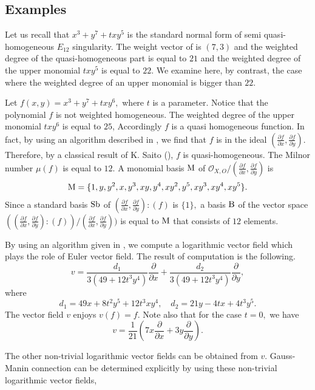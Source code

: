 \documentclass[pdftex]{arxsigma}
\begin{document}

\subsection{Examples}

Let us recall that $ x^3+y^7+txy^5 $ is the standard normal form of semi quasi-homogeneous  $E_{12}$ singularity. The weight vector of  is $(7,3)$ and the weighted degree of the quasi-homogeneous part is equal to $21$ and the weighted degree of the upper monomial $ txy^5 $ is equal to $22$. We examine here, by contrast, the case where the weighted degree of an upper monomial is bigger than $ 22.$

\begin{example}
Let $ f(x,y)=x^3+y^7+txy^6, $ where $t$ is a parameter. Notice that the polynomial $f$ is not weighted homogeneous. The weighted degree of the upper monomial  $ txy^6 $ is equal to $25$, Accordingly $ f $ is a quasi homogeneous function. In fact, by using an algorithm described in \cite{NT16a,T14}, we find that 
$ f $ is in the ideal $ (\frac{\partial f}{\partial x}, \frac{\partial f}{\partial y}). $ Therefore, by a classical result of K. Saito (\cite{S71}), $ f $ is  quasi-homogeneous. The Milnor number $\mu(f) $ is equal to $12$. 
A monomial basis ${\rm M}$ of  $ {\mathcal O}_{X,O}/(\frac{\partial f}{\partial x}, \frac{\partial f}{\partial y}) $ is 
\begin{equation*}
{\rm M} = \{1, y, y^2, x, y^3, xy, y^4, xy^2, y^5, xy^3, xy^4, xy^5 \}. 
\end{equation*}
Since a standard basis ${\rm Sb} $ of $ (\frac{\partial f}{\partial x}, \frac{\partial f}{\partial y}) : (f)  $ is $ \{ 1 \},$  a basis $ {\rm B} $ of the vector space 
$ ( (\frac{\partial f}{\partial x}, \frac{\partial f}{\partial y}) : (f) )/ (\frac{\partial f}{\partial x}, \frac{\partial f}{\partial y})) $ is 
equal to $ {\rm M} $ that consists of $12$ elements. 

By using an algorithm given in \cite{NT16b}, we compute  a logarithmic vector field which plays the role of Euler vector field.
The result of computation is the following. 
\begin{equation*}
v= \frac{d_1}{3(49+12t^3y^4)}\frac{\partial}{\partial x} + \frac{d_2}{3(49+12t^3y^4)}\frac{\partial}{\partial y}, 
\end{equation*}
where
\begin{equation*}
d_1=49x+8t^2y^5+12t^3xy^4, \quad d_2=21y-4tx+4t^3y^5. 
\end{equation*}
The vector field $ v$ enjoys  $ v(f)=f. $ Note also that for the case $ t=0, $ we have 
\begin{equation*}
v= \frac{1}{21}\left(7x\frac{\partial}{\partial x} + 3y\frac{\partial}{\partial y}\right). \end{equation*}


The other non-trivial logarithmic vector fields can be obtained from $v$. Gauss-Manin connection can be determined explicitly by using these non-trivial logarithmic vector fields, 
\end{example}
\end{document}
